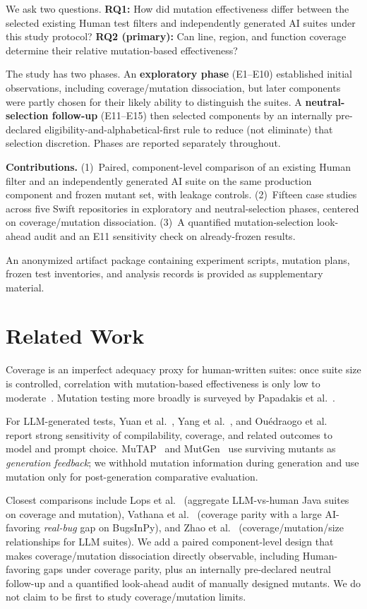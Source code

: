 \documentclass[10pt,conference,a4paper]{IEEEtran}
\begin{document}
We ask two questions. \textbf{RQ1:} How did mutation effectiveness differ between the selected existing Human test filters and independently generated AI suites under this study protocol? \textbf{RQ2 (primary):} Can line, region, and function coverage determine their relative mutation-based effectiveness?

The study has two phases. An \textbf{exploratory phase} (E1--E10) established initial observations, including coverage/mutation dissociation, but later components were partly chosen for their likely ability to distinguish the suites. A \textbf{neutral-selection follow-up} (E11--E15) then selected components by an internally pre-declared eligibility-and-alphabetical-first rule to reduce (not eliminate) that selection discretion. Phases are reported separately throughout.

\textbf{Contributions.} (1)~Paired, component-level comparison of an existing Human filter and an independently generated AI suite on the same production component and frozen mutant set, with leakage controls. (2)~Fifteen case studies across five Swift repositories in exploratory and neutral-selection phases, centered on coverage/mutation dissociation. (3)~A quantified mutation-selection look-ahead audit and an E11 sensitivity check on already-frozen results.

An anonymized artifact package containing experiment scripts, mutation plans, frozen test inventories, and analysis records is provided as supplementary material.

\section{Related Work}
Coverage is an imperfect adequacy proxy for human-written suites: once suite size is controlled, correlation with mutation-based effectiveness is only low to moderate~\cite{inozemtseva2014}. Mutation testing more broadly is surveyed by Papadakis et al.~\cite{papadakis2019survey}.

For LLM-generated tests, Yuan et al.~\cite{yuan2023}, Yang et al.~\cite{yang2024ase}, and Ou\'{e}draogo et al.~\cite{ouedraogo2026} report strong sensitivity of compilability, coverage, and related outcomes to model and prompt choice. MuTAP~\cite{mutap2024} and MutGen~\cite{mutgen2026} use surviving mutants as \emph{generation feedback}; we withhold mutation information during generation and use mutation only for post-generation comparative evaluation.

Closest comparisons include Lops et al.~\cite{lops2025agonetest} (aggregate LLM-vs-human Java suites on coverage and mutation), Vathana et al.~\cite{vathana2026} (coverage parity with a large AI-favoring \emph{real-bug} gap on BugsInPy), and Zhao et al.~\cite{zhao2026} (coverage/mutation/size relationships for LLM suites). We add a paired component-level design that makes coverage/mutation dissociation directly observable, including Human-favoring gaps under coverage parity, plus an internally pre-declared neutral follow-up and a quantified look-ahead audit of manually designed mutants. We do not claim to be first to study coverage/mutation limits.
\end{document}
